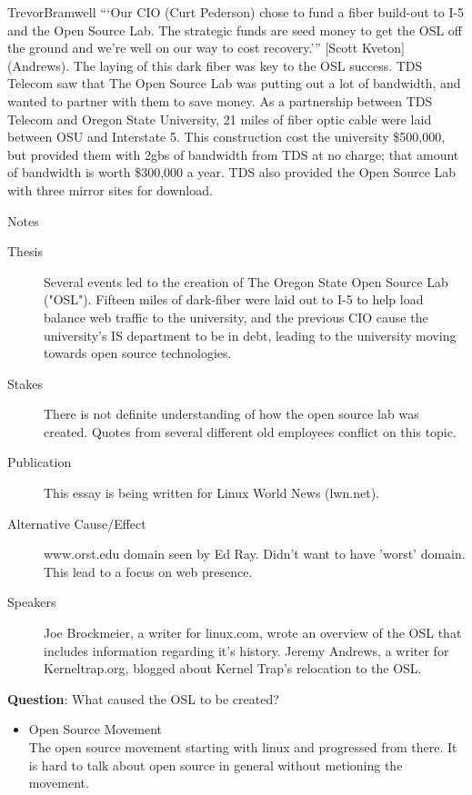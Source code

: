 \documentclass[12pt,letterpaper]{article}
\begin{document}
\begin{mla}{Trevor}{Bramwell}
```Our CIO (Curt Pederson) chose to fund a fiber build-out to I-5 and the Open
Source Lab. The strategic funds are seed money to get the OSL off the ground
and we're well on our way to cost recovery.''' [Scott Kveton] (Andrews).
The laying of this dark fiber was key to the OSL success. TDS Telecom saw that
The Open Source Lab was putting out a lot of bandwidth, and wanted to partner
with them to save money. As a partnership
between TDS Telecom and Oregon State University, 21 miles of fiber optic cable
were laid between OSU and Interstate 5. This construction cost the university
\$500,000, but provided them with 2gbs of bandwidth from TDS at no charge; that
amount of bandwidth is worth \$300,000 a year. TDS also provided the Open
Source Lab with three mirror sites for download.


\pagebreak
{\centering Notes\\}
\begin{description}
    \item[Thesis]
        Several events led to the creation of The Oregon State Open Source Lab 
("OSL"). Fifteen miles of dark-fiber were laid out to I-5 to help load balance
web traffic to the university, and the previous CIO cause the university's IS
department to be in debt, leading to the university moving towards open source
technologies.
    \item[Stakes]
        There is not definite understanding of how the open source lab was
created. Quotes from several different old employees conflict on this topic.
    \item[Publication]
        This essay is being written for Linux World News (lwn.net).
    \item[Alternative Cause/Effect]
        www.orst.edu domain seen by Ed Ray. Didn't want to have 'worst' domain.
This lead to a focus on web presence.
    \item[Speakers]
        Joe Brockmeier, a writer for linux.com, wrote an overview of the OSL
that includes information regarding it's history.
        Jeremy Andrews, a writer for Kerneltrap.org, blogged about Kernel
Trap's relocation to the OSL.
\end{description}
\pagebreak
                        
\noindent\textbf{Question}: What caused the OSL to be created?
\begin{itemize}
    \item Open Source Movement \\
        The open source movement starting with linux and progressed from there.
        It is hard to talk about open source in general without metioning the
        movement.


\end{itemize}
\end{mla}
\end{document}
